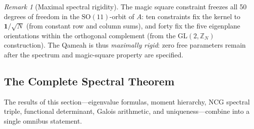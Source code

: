 \documentclass[aps,prd,twocolumn,superscriptaddress,floatfix,nofootinbib]{revtex4-2}
\theoremstyle{definition}
\theoremstyle{remark}
\newtheorem{remark}[theorem]{Remark}
\begin{document}
\begin{remark}[Maximal spectral rigidity]
\label{rem:maximal-rigidity}
The magic square constraint freezes all 50 degrees of freedom in the
$\mathrm{SO}(11)$-orbit of $A$: ten constraints fix the kernel to
$\mathbf{1}/\sqrt{N}$ (from constant row and column sums), and forty
fix the five eigenplane orientations within the orthogonal complement
(from the GL$(2,\mathbb{Z}_N)$ construction). The Qameah is thus
\emph{maximally rigid}: zero free parameters remain after the spectrum
and magic-square property are specified.
\end{remark}

\subsection{The Complete Spectral Theorem}
\label{sec:complete-spectral-theorem}

The results of this section---eigenvalue formulas, moment hierarchy,
NCG spectral triple, functional determinant, Galois arithmetic, and
uniqueness---combine into a single omnibus statement.
\end{document}
